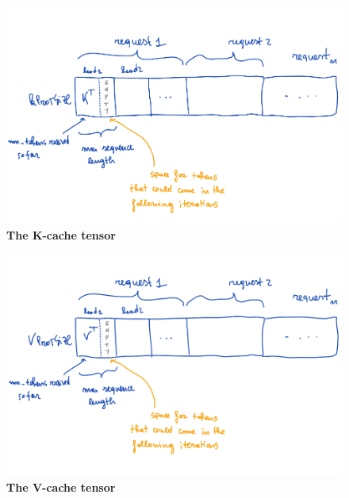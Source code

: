 \begin{figure}[H]
    \centering
    \includegraphics[width=\linewidth]{figures/kcache_tensor.png}
    \caption{\textbf{The K-cache tensor}}
    \label{fig:mha-kcache}
\end{figure}

\begin{figure}[H]
    \centering
    \includegraphics[width=\linewidth]{figures/vcache_tensor.png}
    \caption{\textbf{The V-cache tensor}}
    \label{fig:mha-vcache}
\end{figure}

